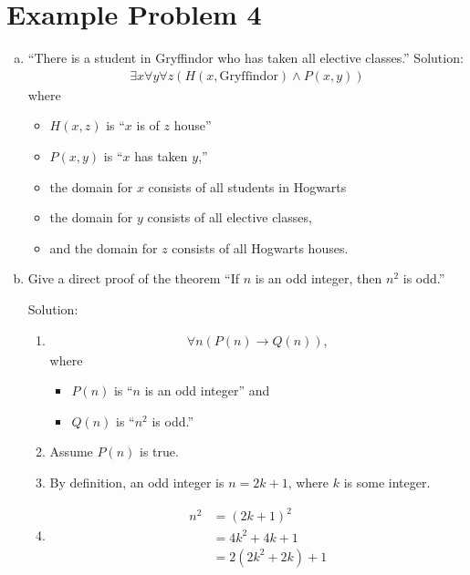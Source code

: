 \documentclass[12pt,letterpaper]{article}
\begin{document}
\section*{Example Problem 4}
\begin{enumerate}[a)]
    \item
    ``There is a student in Gryffindor who has taken all elective classes.''
    Solution:
        \begin{align*}
            \exists x \forall y \forall z ( H(x, \text{Gryffindor}) \wedge P(x,y) )
        \end{align*}
    where
    \begin{itemize}
        \item[] $H(x,z)$ is ``$x$ is of $z$ house''
        \item[] $P(x, y)$ is ``$x$ has taken $y$,''
        \item[] the domain for $x$ consists of all students in Hogwarts
        \item[] the domain for $y$ consists of all elective classes,
        \item[] and the domain for $z$ consists of all Hogwarts houses.
    \end{itemize}

    \item
    Give a direct proof of the theorem ``If $n$ is an odd integer, then $n^2$ is odd.''

    Solution:
    \begin{enumerate}[1.]
        \item
        \begin{align*}
            \forall n(P(n) \rightarrow Q(n)),
        \end{align*}
       where
       \begin{itemize}
            \item[] $P(n)$ is ``$n$ is an odd integer'' and
            \item[] $Q(n)$ is ``$n^2$ is odd.''
       \end{itemize}

        \item
        Assume $P(n)$  is true.

        \item
        By definition, an odd integer is $n = 2k + 1$,
        where $k$ is some integer.

        \item
        \begin{align*}
            n^2 &= (2k + 1)^2 \\
                &= 4k^2 + 4k + 1 \\
                &=  2(2k^2 + 2k) + 1
        \end{align*}


\end{enumerate}
\end{enumerate}
\end{document}
